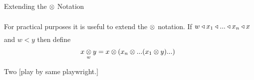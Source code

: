 \newcommand{\inningsCrossSide}{\crossx{innings\kern-0.3cm}{\kern-0.3cm side}{match}}
\newcommand{\inningsCrossPlayer}{\crossx{innings\kern-0.3cm}{\kern-0.3cm player}{match}}
\newcommand{\fieldingSidePlayer}{fieldingSide ^* (\inningsCrossPlayer)}
\newcommand{\battingSidePlayer}{battingSide ^* (\inningsCrossPlayer)}
\newcommand{\overCrossFieldingSidePlayer}{\crossx{over\kern-0.4cm}{\kern-0.4cm(\fieldingSidePlayer)}{innings}}
\newcommand{\deliveryCrossBattingSidePlayer}{\crossx{delivery\kern-0.4cm}{\kern-0.4cm (\battingSidePlayer)}{innings}}

\begin{frame}{Extending the $\crossx{}{}{}$ Notation}

For practical purposes it is useful to extend the $\crossx{}{}{}$ notation.
If $w \base x_1 \base ... \base x_n \base x$
and $w < y$ then define 
$$\crossx{x}{y}{w}=x \cross ( x_n \cross ... (x_1 \cross y)...)$$

Two [play by same playwright.]
\end{frame}

